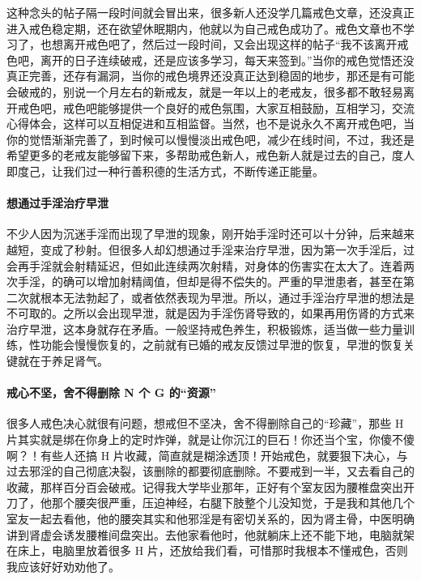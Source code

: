 这种念头的帖子隔一段时间就会冒出来，很多新人还没学几篇戒色文章，还没真正进入戒色稳定期，还在欲望休眠期内，他就以为自己戒色成功了。戒色文章也不学习了，也想离开戒色吧了，然后过一段时间，又会出现这样的帖子“我不该离开戒色吧，离开的日子连续破戒，还是应该多学习，每天来签到。”当你的戒色觉悟还没真正完善，还存有漏洞，当你的戒色境界还没真正达到稳固的地步，那还是有可能会破戒的，别说一个月左右的新戒友，就是一年以上的老戒友，很多都不敢轻易离开戒色吧，戒色吧能够提供一个良好的戒色氛围，大家互相鼓励，互相学习，交流心得体会，这样可以互相促进和互相监督。当然，也不是说永久不离开戒色吧，当你的觉悟渐渐完善了，到时候可以慢慢淡出戒色吧，减少在线时间，不过，我还是希望更多的老戒友能够留下来，多帮助戒色新人，戒色新人就是过去的自己，度人即度己，让我们过一种行善积德的生活方式，不断传递正能量。

\paragraph{想通过手淫治疗早泄}

不少人因为沉迷手淫而出现了早泄的现象，刚开始手淫时还可以十分钟，后来越来越短，变成了秒射。但很多人却幻想通过手淫来治疗早泄，因为第一次手淫后，过会再手淫就会射精延迟，但如此连续两次射精，对身体的伤害实在太大了。连着两次手淫，的确可以增加射精阈值，但却是得不偿失的。严重的早泄患者，甚至在第二次就根本无法勃起了，或者依然表现为早泄。所以，通过手淫治疗早泄的想法是不可取的。之所以会出现早泄，就是因为手淫伤肾导致的，如果再用伤肾的方式来治疗早泄，这本身就存在矛盾。一般坚持戒色养生，积极锻炼，适当做一些力量训练，性功能会慢慢恢复的，之前就有已婚的戒友反馈过早泄的恢复，早泄的恢复关键就在于养足肾气。

\paragraph{戒心不坚，舍不得删除 N 个 G 的“资源”} 很多人戒色决心就很有问题，想戒但不坚决，舍不得删除自己的“珍藏”，那些 H 片其实就是绑在你身上的定时炸弹，就是让你沉江的巨石！你还当个宝，你傻不傻啊？！有些人还搞 H 片收藏，简直就是糊涂透顶！开始戒色，就要狠下决心，与过去邪淫的自己彻底决裂，该删除的都要彻底删除。不要戒到一半，又去看自己的收藏，那样百分百会破戒。记得我大学毕业那年，正好有个室友因为腰椎盘突出开刀了，他那个腰突很严重，压迫神经，右腿下肢整个儿没知觉，于是我和其他几个室友一起去看他，他的腰突其实和他邪淫是有密切关系的，因为肾主骨，中医明确讲到肾虚会诱发腰椎间盘突出。去他家看他时，他就躺床上还不能下地，电脑就架在床上，电脑里放着很多 H 片，还放给我们看，可惜那时我根本不懂戒色，否则我应该好好劝劝他了。

